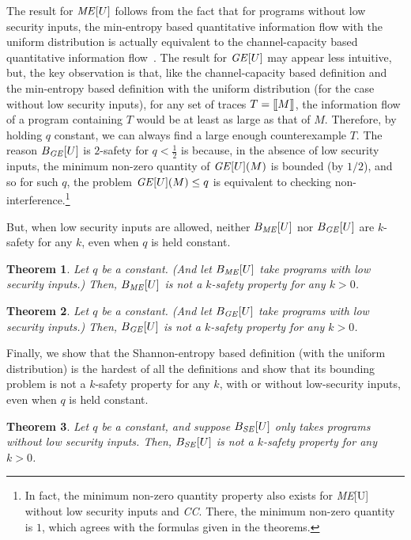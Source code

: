 \documentclass{llncs}
\newtheorem{theorem}{Theorem}[section]
\newcommand{\sembrack}[1]{[\hspace*{-1.2pt}[#1]\hspace*{-1.2pt}]}
\begin{document}
The result for ${\it ME}[U]$ follows from the fact that for programs
without low security inputs, the min-entropy based quantitative
information flow with the uniform distribution is actually equivalent
to the channel-capacity based quantitative information
flow~\cite{smith09}.  The result for ${\it GE}[U]$ may appear less
intuitive, but, the key observation is that, like the channel-capacity
based definition and the min-entropy based definition with the uniform
distribution (for the case without low security inputs), for any set
of traces $T = \sembrack{M}$, the information flow of a program
containing $T$ would be at least as large as that of $M$.  Therefore,
by holding $q$ constant, we can always find a large enough
counterexample $T$.  The reason $B_{\it GE}[U]$ is $2$-safety for
$q<\frac{1}{2}$ is because, in the absence of low security inputs, the
minimum non-zero quantity of ${\it GE}[U](M)$ is bounded (by $1/2$),
and so for such $q$, the problem ${\it GE}[U](M) \leq q$ is equivalent
to checking non-interference.\footnote{In fact, the minimum non-zero
  quantity property also exists for {\it ME}[U] without low security
  inputs and {\it CC}.  There, the minimum non-zero quantity is $1$,
  which agrees with the formulas given in the theorems.}

But, when low security inputs are allowed, neither $B_{\it ME}[U]$ nor
$B_{\it GE}[U]$ are $k$-safety for any $k$, even when $q$ is held
constant.
\begin{theorem}
\label{thm:menk}
Let $q$ be a constant.  (And let $B_{\it ME}[U]$ take programs with
low security inputs.) Then, $B_{\it ME}[U]$ is not a $k$-safety
property for any $k > 0$.
\end{theorem}
\begin{theorem}
\label{thm:genk}
Let $q$ be a constant.  (And let $B_{\it GE}[U]$ take programs with
low security inputs.) Then, $B_{\it GE}[U]$ is not a $k$-safety
property for any $k > 0$.
\end{theorem}

Finally, we show that the Shannon-entropy based definition (with the
uniform distribution) is the hardest of all the definitions and show
that its bounding problem is not a $k$-safety property for any $k$,
with or without low-security inputs, even when $q$ is held constant.
\begin{theorem}
\label{thm:senk}
Let $q$ be a constant, and suppose $B_{\it SE}[U]$ only takes programs
without low security inputs. Then, $B_{\it SE}[U]$ is not a $k$-safety
property for any $k > 0$.
\end{theorem}
\end{document}
